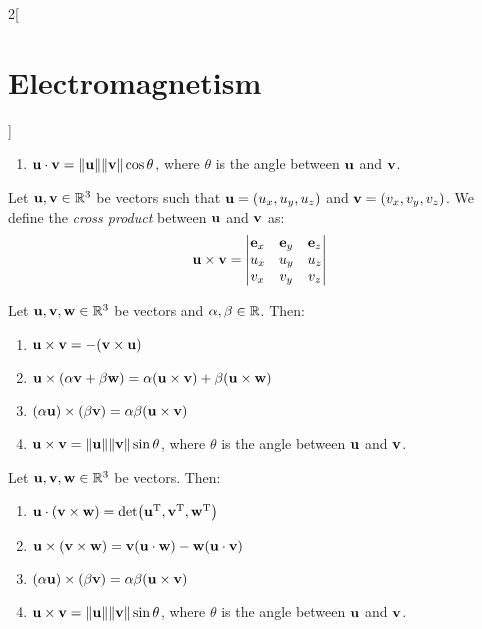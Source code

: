 \documentclass[../../../main.tex]{subfiles}
\begin{document}
\begin{multicols}{2}[\section{Electromagnetism}]
\begin{proposition}
\begin{enumerate}
      \item $\vf{u}\cdot\vf{v}=\norm{\vf{u}}\norm{\vf{v}}\cos\theta$, where $\theta$ is the angle between $\vf{u}$ and $\vf{v}$.
    \end{enumerate}
  \end{proposition}
  \begin{definition}
    Let $\vf{u},\vf{v}\in\RR^3$ be vectors such that $\vf{u}=(u_x,u_y,u_z)$ and $\vf{v}=(v_x,v_y,v_z)$. We define the \emph{cross product} between $\vf{u}$ and $\vf{v}$ as: $$\vf{u}\times\vf{v}=
      \begin{vmatrix}
        \vf{e}_x & \vf{e}_y & \vf{e}_z \\
        u_x      & u_y      & u_z      \\
        v_x      & v_y      & v_z      \\
      \end{vmatrix}$$
  \end{definition}
  \begin{proposition}
    Let $\vf{u},\vf{v},\vf{w}\in\RR^3$ be vectors and $\alpha,\beta \in\RR$. Then:
    \begin{enumerate}
      \item $\vf{u}\times\vf{v}=-(\vf{v}\times\vf{u})$
      \item $\vf{u}\times(\alpha\vf{v}+\beta\vf{w})=\alpha(\vf{u}\times\vf{v})+\beta(\vf{u}\times\vf{w})$
      \item $(\alpha\vf{u})\times(\beta\vf{v})=\alpha\beta(\vf{u}\times\vf{v})$
      \item $\vf{u}\times\vf{v}=\norm{\vf{u}}\norm{\vf{v}}\sin\theta$, where $\theta$ is the angle between $\vf{u}$ and $\vf{v}$.
    \end{enumerate}
  \end{proposition}
  \begin{proposition}
    Let $\vf{u},\vf{v},\vf{w}\in\RR^3$ be vectors. Then:
    \begin{enumerate}
      \item $\vf{u}\cdot(\vf{v}\times\vf{w})=\det(\transpose{\vf{u}},\transpose{\vf{v}},\transpose{\vf{w}})$
      \item $\vf{u}\times(\vf{v}\times\vf{w})=\vf{v}(\vf{u}\cdot\vf{w})-\vf{w}(\vf{u}\cdot\vf{v})$
      \item $(\alpha\vf{u})\times(\beta\vf{v})=\alpha\beta(\vf{u}\times\vf{v})$
      \item $\vf{u}\times\vf{v}=\norm{\vf{u}}\norm{\vf{v}}\sin\theta$, where $\theta$ is the angle between $\vf{u}$ and $\vf{v}$.
    \end{enumerate}

\end{proposition}
\end{multicols}
\end{document}
